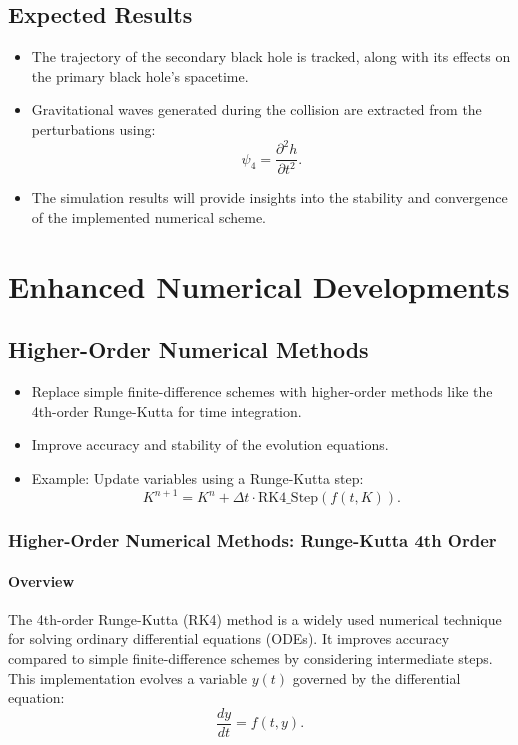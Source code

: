 \documentclass[12pt]{article}
\begin{document}
\subsection{Expected Results}
\begin{itemize}
    \item The trajectory of the secondary black hole is tracked, along with its effects on the primary black hole's spacetime.
    \item Gravitational waves generated during the collision are extracted from the perturbations using:
    \[
    \psi_4 = \frac{\partial^2 h}{\partial t^2}.
    \]
    \item The simulation results will provide insights into the stability and convergence of the implemented numerical scheme.
\end{itemize}

\section{Enhanced Numerical Developments}

\subsection{Higher-Order Numerical Methods}
\begin{itemize}
    \item Replace simple finite-difference schemes with higher-order methods like the 4th-order Runge-Kutta for time integration.
    \item Improve accuracy and stability of the evolution equations.
    \item Example: Update variables using a Runge-Kutta step:
    \[
    K^{n+1} = K^n + \Delta t \cdot \text{RK4\_Step}(f(t, K)).
    \]
\end{itemize}

\subsubsection{Higher-Order Numerical Methods: Runge-Kutta 4th Order}

\paragraph{Overview}
The 4th-order Runge-Kutta (RK4) method is a widely used numerical technique for solving ordinary differential equations (ODEs). It improves accuracy compared to simple finite-difference schemes by considering intermediate steps. This implementation evolves a variable $y(t)$ governed by the differential equation:
\[
\frac{dy}{dt} = f(t, y).
\]
\end{document}
